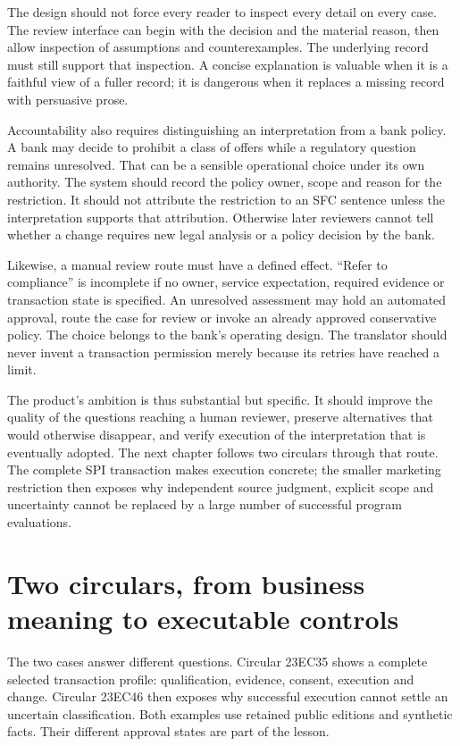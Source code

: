 \documentclass[12pt,a4paper,oneside,openany]{book}
\begin{document}
The design should not force every reader to inspect every detail on every case.
The review interface can begin with the decision and the material reason, then
allow inspection of assumptions and counterexamples. The underlying record must
still support that inspection. A concise explanation is valuable when it is a
faithful view of a fuller record; it is dangerous when it replaces a missing
record with persuasive prose.

Accountability also requires distinguishing an interpretation from a bank policy.
A bank may decide to prohibit a class of offers while a regulatory question
remains unresolved. That can be a sensible operational choice under its own
authority. The system should record the policy owner, scope and reason for the
restriction. It should not attribute the restriction to an SFC sentence unless
the interpretation supports that attribution. Otherwise later reviewers cannot
tell whether a change requires new legal analysis or a policy decision by the
bank.

Likewise, a manual review route must have a defined effect. ``Refer to compliance''
is incomplete if no owner, service expectation, required evidence or transaction
state is specified. An unresolved assessment may hold an automated approval,
route the case for review or invoke an already approved conservative policy. The
choice belongs to the bank's operating design. The translator should never
invent a transaction permission merely because its retries have reached a limit.

The product's ambition is thus substantial but specific. It should improve the
quality of the questions reaching a human reviewer, preserve alternatives that
would otherwise disappear, and verify execution of the interpretation that is
eventually adopted. The next chapter follows two circulars through that route. The complete
SPI transaction makes execution concrete; the smaller marketing restriction
then exposes why independent source judgment, explicit scope and uncertainty
cannot be replaced by a large number of successful program evaluations.


\chapter{Two circulars, from business meaning to executable controls}
\label{ch:circular}


The two cases answer different questions. Circular 23EC35 shows a complete
selected transaction profile: qualification, evidence, consent, execution and
change. Circular 23EC46 then exposes why successful execution cannot settle an
uncertain classification. Both examples use retained public editions and
synthetic facts. Their different approval states are part of the lesson.
\end{document}
